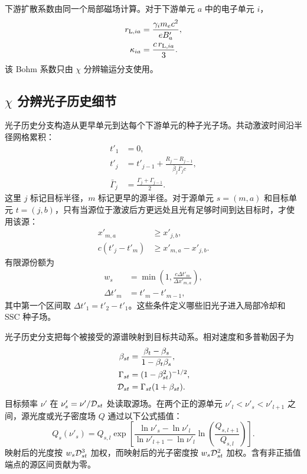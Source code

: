 \documentclass[twocolumn]{aastex702}
\begin{document}
下游扩散系数由同一个局部磁场计算。对于下游单元 \(a\) 中的电子单元 \(i\)，
\begin{equation}
\begin{aligned}
r_{{\rm L},ia}&=\frac{\gamma_i m_ec^2}{eB'_a},\\
\kappa_{ia}&=\frac{c\,r_{{\rm L},ia}}{3}.
\end{aligned}
\end{equation}
该 Bohm 系数只由 \(\chi\) 分辨输运分支使用。

\subsection{\texorpdfstring{\(\chi\)}{chi} 分辨光子历史细节}

光子历史分支构造从更早单元到达每个下游单元的种子光子场。共动激波时间沿半径网格累积：
\begin{equation}
\begin{aligned}
t'_1&=0,\\
t'_j&=t'_{j-1}+
\frac{R_j-R_{j-1}}
{\bar\beta_j\bar\Gamma_j c},\\
\bar\Gamma_j&=\frac{\Gamma_j+\Gamma_{j-1}}{2}.
\end{aligned}
\end{equation}
这里 \(j\) 标记目标半径，\(m\) 标记更早的源半径。对于源单元 \(s=(m,a)\) 和目标单元 \(t=(j,b)\)，只有当源位于激波后方更远处且光有足够时间到达目标时，才使用该源：
\begin{equation}
\begin{aligned}
x'_{m,a}&\ge x'_{j,b},\\
c(t'_j-t'_m)&\ge x'_{m,a}-x'_{j,b}.
\end{aligned}
\end{equation}
有限源份额为
\begin{equation}
\begin{aligned}
w_s&=\min\left(1,\frac{c\Delta t'_m}{\Delta x'_{m,a}}\right),\\
\Delta t'_m&=t'_m-t'_{m-1},
\end{aligned}
\end{equation}
其中第一个区间取 \(\Delta t'_1=t'_2-t'_1\)。这些条件定义哪些旧光子进入局部冷却和 SSC 种子场。

光子历史分支把每个被接受的源谱映射到目标共动系。相对速度和多普勒因子为
\begin{equation}
\begin{aligned}
\beta_{st}&=\frac{\beta_t-\beta_s}{1-\beta_t\beta_s},\\
\Gamma_{st}&=(1-\beta_{st}^2)^{-1/2},\\
{\cal D}_{st}&=\Gamma_{st}(1+\beta_{st}) .
\end{aligned}
\end{equation}
目标频率 \(\nu'\) 在 \(\nu'_s=\nu'/{\cal D}_{st}\) 处读取源场。在两个正的源单元 \(\nu'_l<\nu'_s<\nu'_{l+1}\) 之间，源光度或光子密度场 \(Q\) 通过以下公式插值：
\begin{equation}
Q_s(\nu'_s)=Q_{s,l}
\exp\!\left[
\frac{\ln\nu'_s-\ln\nu'_l}
{\ln\nu'_{l+1}-\ln\nu'_l}
\ln\!\left(\frac{Q_{s,l+1}}{Q_{s,l}}\right)
\right].
\end{equation}
映射后的光度按 \(w_s{\cal D}_{st}^3\) 加权，而映射后的光子密度按 \(w_s{\cal D}_{st}^2\) 加权。含有非正插值端点的源区间贡献为零。
\end{document}
